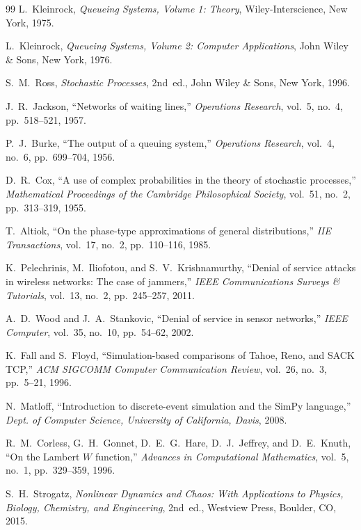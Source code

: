 \documentclass[12pt,onecolumn]{article}
\begin{document}
\begin{thebibliography}{99}
L.~Kleinrock, \textit{Queueing Systems, Volume 1: Theory}, Wiley-Interscience, New York, 1975.

L.~Kleinrock, \textit{Queueing Systems, Volume 2: Computer Applications}, John Wiley \& Sons, New York, 1976.

S.~M.~Ross, \textit{Stochastic Processes}, 2nd~ed., John Wiley \& Sons, New York, 1996.

J.~R.~Jackson, ``Networks of waiting lines,'' \textit{Operations Research}, vol.~5, no.~4, pp.~518--521, 1957.

P.~J.~Burke, ``The output of a queuing system,'' \textit{Operations Research}, vol.~4, no.~6, pp.~699--704, 1956.

D.~R.~Cox, ``A use of complex probabilities in the theory of stochastic processes,'' \textit{Mathematical Proceedings of the Cambridge Philosophical Society}, vol.~51, no.~2, pp.~313--319, 1955.

T.~Altiok, ``On the phase-type approximations of general distributions,'' \textit{IIE Transactions}, vol.~17, no.~2, pp.~110--116, 1985.

K.~Pelechrinis, M.~Iliofotou, and S.~V.~Krishnamurthy, ``Denial of service attacks in wireless networks: The case of jammers,'' \textit{IEEE Communications Surveys \& Tutorials}, vol.~13, no.~2, pp.~245--257, 2011.

A.~D.~Wood and J.~A.~Stankovic, ``Denial of service in sensor networks,'' \textit{IEEE Computer}, vol.~35, no.~10, pp.~54--62, 2002.

K.~Fall and S.~Floyd, ``Simulation-based comparisons of Tahoe, Reno, and SACK TCP,'' \textit{ACM SIGCOMM Computer Communication Review}, vol.~26, no.~3, pp.~5--21, 1996.

N.~Matloff, ``Introduction to discrete-event simulation and the SimPy language,'' \textit{Dept. of Computer Science, University of California, Davis}, 2008.

R.~M.~Corless, G.~H.~Gonnet, D.~E.~G.~Hare, D.~J.~Jeffrey, and D.~E.~Knuth, ``On the Lambert $W$ function,'' \textit{Advances in Computational Mathematics}, vol.~5, no.~1, pp.~329--359, 1996.

S.~H.~Strogatz, \textit{Nonlinear Dynamics and Chaos: With Applications to Physics, Biology, Chemistry, and Engineering}, 2nd~ed., Westview Press, Boulder, CO, 2015.
\end{thebibliography}
\end{document}
